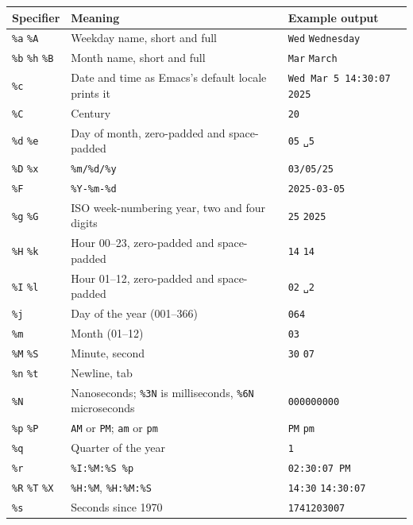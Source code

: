 \documentclass[11pt]{article}
\begin{document}
\begin{center}
\begin{tabular}{lll}
Specifier & Meaning & Example output\\[0pt]
\hline
\texttt{\%a} \texttt{\%A} & Weekday name, short and full & \texttt{Wed} \texttt{Wednesday}\\[0pt]
\texttt{\%b} \texttt{\%h} \texttt{\%B} & Month name, short and full & \texttt{Mar} \texttt{March}\\[0pt]
\texttt{\%c} & Date and time as Emacs's default locale prints it & \texttt{Wed Mar  5 14:30:07 2025}\\[0pt]
\texttt{\%C} & Century & \texttt{20}\\[0pt]
\texttt{\%d} \texttt{\%e} & Day of month, zero-padded and space-padded & \texttt{05} \texttt{␣5}\\[0pt]
\texttt{\%D} \texttt{\%x} & \texttt{\%m/\%d/\%y} & \texttt{03/05/25}\\[0pt]
\texttt{\%F} & \texttt{\%Y-\%m-\%d} & \texttt{2025-03-05}\\[0pt]
\texttt{\%g} \texttt{\%G} & ISO week-numbering year, two and four digits & \texttt{25} \texttt{2025}\\[0pt]
\texttt{\%H} \texttt{\%k} & Hour 00–23, zero-padded and space-padded & \texttt{14} \texttt{14}\\[0pt]
\texttt{\%I} \texttt{\%l} & Hour 01–12, zero-padded and space-padded & \texttt{02} \texttt{␣2}\\[0pt]
\texttt{\%j} & Day of the year (001–366) & \texttt{064}\\[0pt]
\texttt{\%m} & Month (01–12) & \texttt{03}\\[0pt]
\texttt{\%M} \texttt{\%S} & Minute, second & \texttt{30} \texttt{07}\\[0pt]
\texttt{\%n} \texttt{\%t} & Newline, tab & \\[0pt]
\texttt{\%N} & Nanoseconds; \texttt{\%3N} is milliseconds, \texttt{\%6N} microseconds & \texttt{000000000}\\[0pt]
\texttt{\%p} \texttt{\%P} & \texttt{AM} or \texttt{PM}; \texttt{am} or \texttt{pm} & \texttt{PM} \texttt{pm}\\[0pt]
\texttt{\%q} & Quarter of the year & \texttt{1}\\[0pt]
\texttt{\%r} & \texttt{\%I:\%M:\%S \%p} & \texttt{02:30:07 PM}\\[0pt]
\texttt{\%R} \texttt{\%T} \texttt{\%X} & \texttt{\%H:\%M}, \texttt{\%H:\%M:\%S} & \texttt{14:30} \texttt{14:30:07}\\[0pt]
\texttt{\%s} & Seconds since 1970 & \texttt{1741203007}\\[0pt]

\end{tabular}
\end{center}
\end{document}
